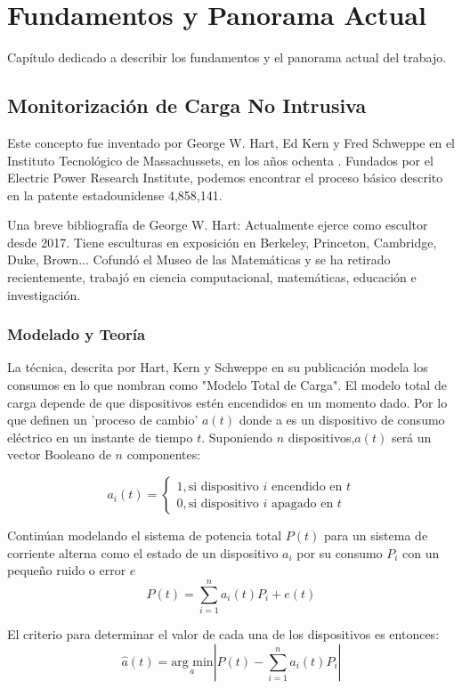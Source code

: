 \chapter{Fundamentos y Panorama Actual}
\label{ch:fundamentos}
Capítulo dedicado a describir los fundamentos y el panorama actual del trabajo. 

\section{Monitorización de Carga No Intrusiva}
\label{se:MonitorizaciondeCargaNoIntrusiva}
Este concepto fue inventado por George W. Hart, Ed Kern y Fred Schweppe en el Instituto Tecnológico de Massachussets, en los años ochenta \autocite{192069}. Fundados por el Electric Power Research Institute, podemos encontrar el proceso básico descrito en la patente estadounidense 4,858,141.

Una breve bibliografía de George W. Hart: Actualmente ejerce como escultor desde 2017. Tiene esculturas en exposición en Berkeley, Princeton, Cambridge, Duke, Brown... Cofundó el Museo de las Matemáticas y se ha retirado recientemente, trabajó en ciencia computacional, matemáticas, educación e investigación.

\subsection{Modelado y Teoría}
\label{sse:ModeladoyTeoria}
La técnica, descrita por Hart, Kern y Schweppe en su publicación modela los consumos en lo que nombran como "Modelo Total de Carga". El modelo total de carga depende de que dispositivos estén encendidos en un momento dado. Por lo que definen un 'proceso de cambio'
$a(t)$ donde a es un dispositivo de consumo eléctrico en un instante de tiempo $t$. Suponiendo $n$ dispositivos,$a(t)$ será un vector Booleano de $n$ componentes:

$$
a_i(t)=
	\left\{
	\begin{array}{l}
	1,\text{si dispositivo } i \text{ encendido en } t\\
	0, \text{si dispositivo } i \text{ apagado en } t
	\end{array}
	\right.
$$

Continúan modelando el sistema de potencia total $P(t)$ para un sistema de corriente alterna como el estado de un dispositivo $a_i$ por su consumo $P_i$ con un pequeño ruido o error $e$
$$
P(t)=\sum_{i=1}^{n} a_i(t)P_i+e(t)
$$

El criterio para determinar el valor de cada una de los dispositivos es entonces:
$$
\hat{a}(t) = \underset{a}{\text{arg min}} \left| P(t) - \sum_{i=1}^{n} a_i(t)P_i \right|
$$

